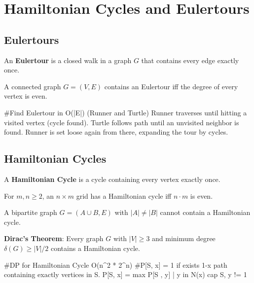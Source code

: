 \section{Hamiltonian Cycles and Eulertours}

\subsection{Eulertours}

\begin{definition}
	An \textbf{Eulertour} is a closed walk in a graph $G$ that contains every edge exactly once.
\end{definition}

\begin{theorem}
	A connected graph $G = (V, E)$ contains an Eulertour iff the degree of every vertex is even.
\end{theorem}

\begin{algorithm}
	#Find Eulertour in O(|E|) (Runner and Turtle)
	Runner traverses until hitting a visited vertex (cycle found).
	Turtle follows path until an unvisited neighbor is found.
	Runner is set loose again from there, expanding the tour by cycles.
\end{algorithm}

\subsection{Hamiltonian Cycles}

\begin{definition}
	A \textbf{Hamiltonian Cycle} is a cycle containing every vertex exactly once.
\end{definition}

\begin{theorem}
	For $m, n \ge 2$, an $n \times m$ grid has a Hamiltonian cycle iff $n \cdot m$ is even.
\end{theorem}

\begin{theorem}
	A bipartite graph $G = (A \cup B, E)$ with $|A| \neq |B|$ cannot contain a Hamiltonian cycle.
\end{theorem}

\begin{theorem}
	\textbf{Dirac's Theorem}: Every graph $G$ with $|V| \ge 3$ and minimum degree $\delta(G) \ge |V|/2$ contains a Hamiltonian cycle.
\end{theorem}

\begin{algorithm}
	#DP for Hamiltonian Cycle O(n^2 * 2^n)
	#P[S, x] = 1 if exists 1-x path containing exactly vertices in S.
	P[S, x] = max { P[S , y] | y in N(x) cap S, y != 1 }
\end{algorithm}

